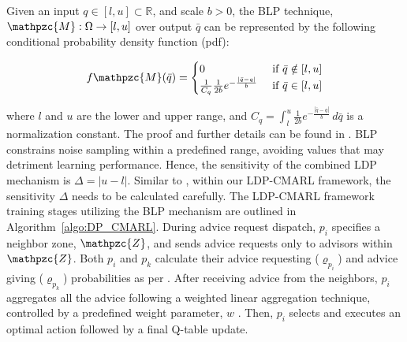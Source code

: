 \begin{definition}
   Given an input $q \in \left[l, u\right] \subset \mathbb{R}$, and scale $b>0$, the BLP technique, $\mathpzc{M}: \Omega \rightarrow \left[l, u\right]$ over output $\bar{q}$ can be represented by the following conditional probability density function (pdf):
   
   \begin{equation}
       f\mathpzc{M}(\bar{q}) = 
       \begin{cases}
       0 & \text{ if } \bar{q} \notin \left[l,u\right]\\
       \frac{1}{C_q} \frac{1}{2b}e^{-\frac{\lvert \bar{q}- q\rvert}{b}} & \text{ if } \bar{q} \in \left[l,u\right]
       \end{cases}
   \end{equation}
\end{definition}
where $l$ and $u$ are the lower and upper range, and $C_q = \int_{l}^{u} \frac{1}{2b}e^{-\frac{|\bar{q}- q|}{b}} \,d\bar{q}$ is a normalization constant. The proof and further details can be found in \cite{Neera2023}. BLP constrains noise sampling within a predefined range, avoiding values that may detriment learning performance. Hence, the sensitivity of the combined LDP mechanism is $\Delta = \lvert u-l\rvert$. Similar to \cite{ye2022differential}, within our LDP-CMARL framework, the sensitivity $\Delta$ needs to be calculated carefully. The LDP-CMARL framework training stages utilizing the BLP mechanism are outlined in Algorithm~\ref{algo:DP_CMARL}. During advice request dispatch, $p_i$ specifies a neighbor zone, $\mathpzc{Z}$, and sends advice requests only to advisors within $\mathpzc{Z}$. Both $p_i$ and $p_k$ calculate their advice requesting ($\varrho_{p_i}$) and advice giving ($\varrho_{p_k}$) probabilities as per \cite{ye2022differential}. After receiving advice from the neighbors, $p_i$ aggregates all the advice following a weighted linear aggregation technique, controlled by a predefined weight parameter, $w$ \cite{hossain2023BRNES}. Then, $p_i$ selects and executes an optimal action followed by a final Q-table update.

